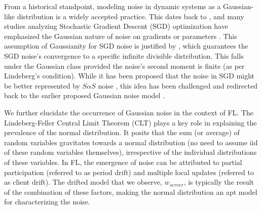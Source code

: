 From a historical standpoint, modeling noise in dynamic systems as a Gaussian-like distribution is a widely accepted practice. This dates back to \citep{kramers1940brownian}, and many studies analyzing Stochastic Gradient Descent (SGD) optimization have emphasized the Gaussian nature of noise on gradients or parameters \citep{mandt2017stochastic,zhu2019anisotropic,simsekli2019tail,ziyin2021strength}.  This assumption of Gaussianity for SGD noise is justified by \citet{wu2020noisy}, which guarantees the SGD noise's convergence to a specific infinite divisible distribution. This falls under the Gaussian class provided the noise's second moment is finite (as per Lindeberg's condition). While it has been proposed that the noise in SGD might be better represented by $S\alpha S$ noise \citep{simsekli2019tail}, this idea has been challenged and redirected back to the earlier proposed Gaussian noise model \citep{zhekexie2021a, battash2023revisiting}.

We further elucidate the occurrence of Gaussian noise in the context of FL. The Lindeberg-Feller Central Limit Theorem (CLT) \citep{lindeberg1922neue} plays a key role in explaining the prevalence of the normal distribution. It posits that the sum (or average) of random variables gravitates towards a normal distribution (no need to assume iid of these random variables themselves), irrespective of the individual distributions of these variables. In FL, the emergence of noise can be attributed to partial participation (referred to as period drift) and multiple local updates (referred to as client drift). The drifted model that we observe, $w_{server}$, is typically the result of the combination of these factors, making the normal distribution an apt model for characterizing the noise. 


